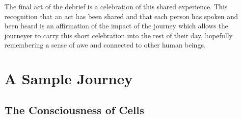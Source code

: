 \documentclass[12pt]{book}
\begin{document}
					
The final act of the debrief is a celebration of this shared experience. This recognition that an act has been shared and that each person has spoken and been heard is an affirmation of the impact of the journey which allows the journeyer to carry this short celebration into the rest of their day, hopefully remembering a sense of awe and connected to other human beings.


\chapter{A Sample Journey}


\section{The Consciousness of Cells}
\end{document}
